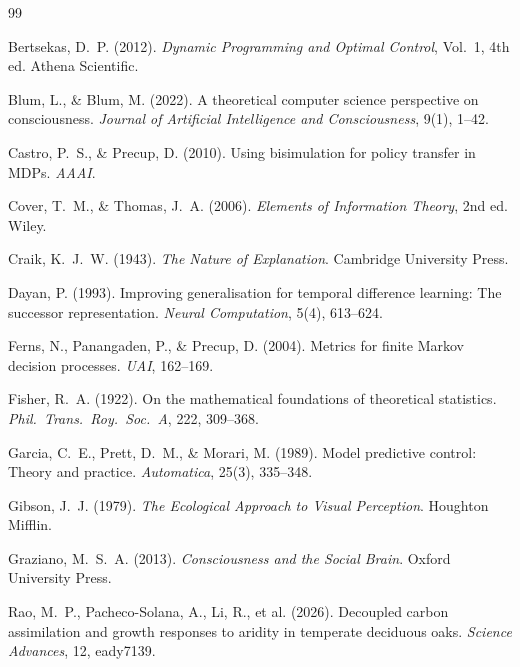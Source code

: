 \documentclass[10pt,twocolumn]{article}
\theoremstyle{plain}
\theoremstyle{definition}
\theoremstyle{remark}
\begin{document}
\begin{thebibliography}{99}

Bertsekas, D.~P. (2012).
\textit{Dynamic Programming and Optimal Control}, Vol.~1, 4th ed.
Athena Scientific.

Blum, L., \& Blum, M. (2022).
A theoretical computer science perspective on consciousness.
\textit{Journal of Artificial Intelligence and Consciousness}, 9(1), 1--42.

Castro, P.~S., \& Precup, D. (2010).
Using bisimulation for policy transfer in MDPs.
\textit{AAAI}.

Cover, T.~M., \& Thomas, J.~A. (2006).
\textit{Elements of Information Theory}, 2nd ed.
Wiley.

Craik, K.~J.~W. (1943).
\textit{The Nature of Explanation}.
Cambridge University Press.

Dayan, P. (1993).
Improving generalisation for temporal difference learning: The successor
representation.
\textit{Neural Computation}, 5(4), 613--624.

Ferns, N., Panangaden, P., \& Precup, D. (2004).
Metrics for finite Markov decision processes.
\textit{UAI}, 162--169.

Fisher, R.~A. (1922).
On the mathematical foundations of theoretical statistics.
\textit{Phil.\ Trans.\ Roy.\ Soc.\ A}, 222, 309--368.

Garcia, C.~E., Prett, D.~M., \& Morari, M. (1989).
Model predictive control: Theory and practice.
\textit{Automatica}, 25(3), 335--348.

Gibson, J.~J. (1979).
\textit{The Ecological Approach to Visual Perception}.
Houghton Mifflin.

Graziano, M.~S.~A. (2013).
\textit{Consciousness and the Social Brain}.
Oxford University Press.

Rao, M.~P., Pacheco-Solana, A., Li, R., et al. (2026).
Decoupled carbon assimilation and growth responses to aridity in temperate
deciduous oaks.
\textit{Science Advances}, 12, eady7139.


\end{thebibliography}
\end{document}
